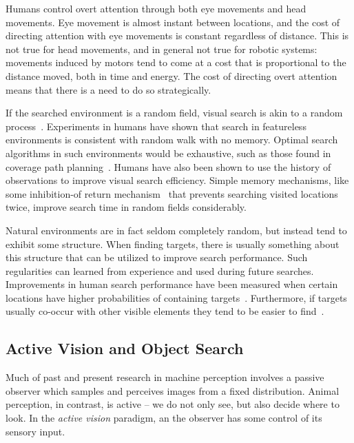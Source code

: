 Humans control overt attention through both eye movements and head movements.
Eye movement is almost instant between locations, and the cost of directing attention with eye movements is constant regardless of distance.
This is not true for head movements, and in general not true for robotic systems:
movements induced by motors tend to come at a cost that is proportional to the distance moved, both in time and energy.
The cost of directing overt attention means that there is a need to do so strategically.

If the searched environment is a random field, visual search is akin to a random process~\cite{nakayama_situating_2011}.
Experiments in humans have shown that search in featureless environments is consistent with random walk with no memory.
Optimal search algorithms in such environments would be exhaustive, such as those found in coverage path planning~\cite{galceran_survey_2013}.
Humans have also been shown to use the history of observations to improve visual search efficiency. 
Simple memory mechanisms, like some inhibition-of return mechanism~\cite{itti_computational_2001} that prevents searching visited locations twice, improve search time in random fields considerably.

Natural environments are in fact seldom completely random, but instead tend to exhibit some structure.
When finding targets, there is usually something about this structure that can be utilized to improve search performance.
Such regularities can learned from experience and used during future searches.
Improvements in human search performance have been measured when certain locations have higher probabilities of containing targets~\cite{eckstein_visual_2011,wolfe_five_2017}.
Furthermore, if targets usually co-occur with other visible elements they tend to be easier to find~\cite{eckstein_visual_2011,wolfe_five_2017}.

\subsection{Active Vision and Object Search} 
\label{sec:activevision}

Much of past and present research in machine perception involves a passive observer which samples and perceives images from a fixed distribution.
Animal perception, in contrast, is active -- we do not only see, but also decide where to look.
In the \textit{active vision} paradigm, an the observer has some control of its sensory input.~\cite{aloimonos_active_1988}

